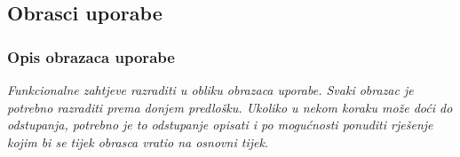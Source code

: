 			\eject 

			\subsection{Obrasci uporabe}
				
				
				\subsubsection{Opis obrazaca uporabe}
					\textit{Funkcionalne zahtjeve razraditi u obliku obrazaca uporabe. Svaki obrazac je potrebno razraditi prema donjem predlošku. Ukoliko u nekom koraku može doći do odstupanja, potrebno je to odstupanje opisati i po mogućnosti ponuditi rješenje kojim bi se tijek obrasca vratio na osnovni tijek.}\\
					

